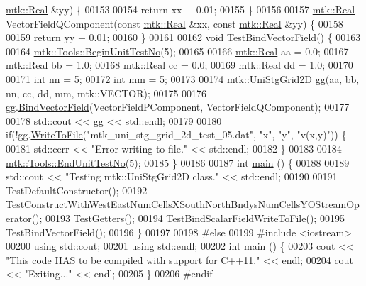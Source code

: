 \begin{DoxyCode}
      \hyperlink{group__c01-roots_gac080bbbf5cbb5502c9f00405f894857d}{mtk::Real} &yy) \{
00153 
00154   \textcolor{keywordflow}{return} xx + 0.01;
00155 \}
00156 
00157 \hyperlink{group__c01-roots_gac080bbbf5cbb5502c9f00405f894857d}{mtk::Real} VectorFieldQComponent(\textcolor{keyword}{const} \hyperlink{group__c01-roots_gac080bbbf5cbb5502c9f00405f894857d}{mtk::Real} &xx, \textcolor{keyword}{const} 
      \hyperlink{group__c01-roots_gac080bbbf5cbb5502c9f00405f894857d}{mtk::Real} &yy) \{
00158 
00159   \textcolor{keywordflow}{return} yy + 0.01;
00160 \}
00161 
00162 \textcolor{keywordtype}{void} TestBindVectorField() \{
00163 
00164   \hyperlink{classmtk_1_1Tools_afc29ecaf337a13ed2e817d3890a5a441}{mtk::Tools::BeginUnitTestNo}(5);
00165 
00166   \hyperlink{group__c01-roots_gac080bbbf5cbb5502c9f00405f894857d}{mtk::Real} aa = 0.0;
00167   \hyperlink{group__c01-roots_gac080bbbf5cbb5502c9f00405f894857d}{mtk::Real} bb = 1.0;
00168   \hyperlink{group__c01-roots_gac080bbbf5cbb5502c9f00405f894857d}{mtk::Real} cc = 0.0;
00169   \hyperlink{group__c01-roots_gac080bbbf5cbb5502c9f00405f894857d}{mtk::Real} dd = 1.0;
00170 
00171   \textcolor{keywordtype}{int} nn = 5;
00172   \textcolor{keywordtype}{int} mm = 5;
00173 
00174   \hyperlink{classmtk_1_1UniStgGrid2D}{mtk::UniStgGrid2D} gg(aa, bb, nn, cc, dd, mm, mtk::VECTOR);
00175 
00176   gg.\hyperlink{classmtk_1_1UniStgGrid2D_ae274b24672e9bd6075bf38b015bd9083}{BindVectorField}(VectorFieldPComponent, VectorFieldQComponent);
00177 
00178   std::cout << gg << std::endl;
00179 
00180   \textcolor{keywordflow}{if}(!gg.\hyperlink{classmtk_1_1UniStgGrid2D_a1787a79e4bcee6b89c681dc7e5e2d7bc}{WriteToFile}(\textcolor{stringliteral}{"mtk\_uni\_stg\_grid\_2d\_test\_05.dat"}, \textcolor{stringliteral}{"x"}, \textcolor{stringliteral}{"y"}, \textcolor{stringliteral}{"v(x,y)"})) \{
00181     std::cerr << \textcolor{stringliteral}{"Error writing to file."} << std::endl;
00182   \}
00183 
00184   \hyperlink{classmtk_1_1Tools_aba67d9dc35c9c1c49430fcc9ea035e03}{mtk::Tools::EndUnitTestNo}(5);
00185 \}
00186 
00187 \textcolor{keywordtype}{int} \hyperlink{mtk__uni__stg__grid__2d__test_8cc_ae66f6b31b5ad750f1fe042a706a4e3d4}{main} () \{
00188 
00189   std::cout << \textcolor{stringliteral}{"Testing mtk::UniStgGrid2D class."} << std::endl;
00190 
00191   TestDefaultConstructor();
00192   TestConstructWithWestEastNumCellsXSouthNorthBndysNumCellsYOStreamOperator();
00193   TestGetters();
00194   TestBindScalarFieldWriteToFile();
00195   TestBindVectorField();
00196 \}
00197 
00198 \textcolor{preprocessor}{#else}
00199 \textcolor{preprocessor}{#include <iostream>}
00200 \textcolor{keyword}{using} std::cout;
00201 \textcolor{keyword}{using} std::endl;
\hypertarget{mtk__uni__stg__grid__2d__test_8cc_source_l00202}{}\hyperlink{mtk__uni__stg__grid__2d__test_8cc_ae66f6b31b5ad750f1fe042a706a4e3d4}{00202} \textcolor{keywordtype}{int} \hyperlink{mtk__uni__stg__grid__2d__test_8cc_ae66f6b31b5ad750f1fe042a706a4e3d4}{main} () \{
00203   cout << \textcolor{stringliteral}{"This code HAS to be compiled with support for C++11."} << endl;
00204   cout << \textcolor{stringliteral}{"Exiting..."} << endl;
00205 \}
00206 \textcolor{preprocessor}{#endif}
\end{DoxyCode}

